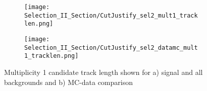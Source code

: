 \begin{figure}[H]
\centering
  \begin{subfigure}[t]{0.4\textwidth}
    \centering
\texttt{[image: Selection\_II\_Section/CutJustify\_sel2\_mult1\_tracklen.png]}
    \caption{ }
  \end{subfigure} 
  \hspace{20mm}
  \begin{subfigure}[t]{0.4\textwidth}
    \centering
\texttt{[image: Selection\_II\_Section/CutJustify\_sel2\_datamc\_mult1\_tracklen.png]}
    \caption{ }
  \end{subfigure} 
\caption{Multiplicity 1 candidate track length shown for a) signal and all backgrounds and b) MC-data comparison }
\label{fig:cutjust_sel2_mult1_len}
\end{figure}

